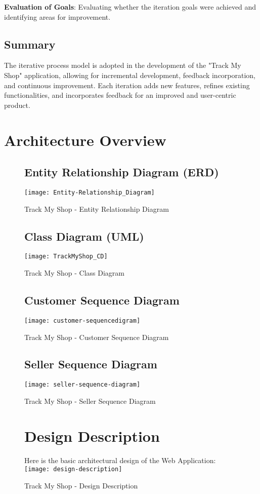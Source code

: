 \textbf{Evaluation of Goals}:
Evaluating whether the iteration goals were achieved and identifying areas for improvement.

\subsection{Summary}

The iterative process model is adopted in the development of the "Track My Shop" application, allowing for incremental development, feedback incorporation, and continuous improvement. Each iteration adds new features, refines existing functionalities, and incorporates feedback for an improved and user-centric product.






\section{Architecture Overview}


\begin{figure}[h]
	\subsection{Entity Relationship Diagram (ERD) }
	\centering
	\texttt{[image: Entity-Relationship\_Diagram]}
	\caption{Track My Shop - Entity Relationship Diagram}
\end{figure}

\pagebreak
\begin{figure}[h]
	\subsection{Class Diagram (UML) }
	\centering
	\texttt{[image: TrackMyShop\_CD]}
	\caption{Track My Shop - Class Diagram}
\end{figure}

\pagebreak
\begin{figure}[h]
	\subsection{Customer Sequence Diagram }
	\centering
	\texttt{[image: customer-sequencedigram]}
	\caption{Track My Shop - Customer Sequence Diagram}
\end{figure}

\pagebreak
\begin{figure}[h]
	\subsection{Seller Sequence Diagram}
	\centering
	\texttt{[image: seller-sequence-diagram]}
	\caption{Track My Shop - Seller Sequence Diagram}
\end{figure}


\pagebreak

\begin{figure}[h]
	\section{Design Description}
	Here is the basic architectural design of the Web Application:\\
	\centering
	\texttt{[image: design-description]}
	\caption{Track My Shop - Design Description}
\end{figure}



